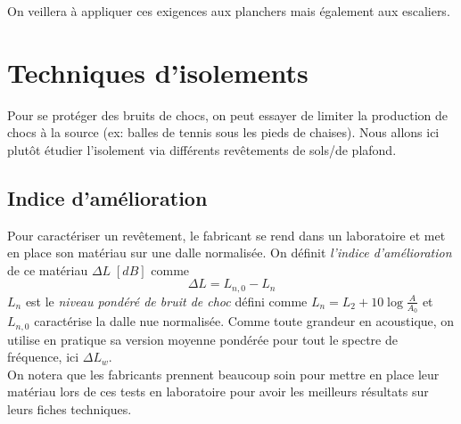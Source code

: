 \documentclass[11pt]{report}
\begin{document}
On veillera à appliquer ces exigences aux planchers mais également aux escaliers.

\section{Techniques d'isolements}
Pour se protéger des bruits de chocs, on peut essayer de limiter la production de chocs à la source (ex: balles de tennis sous les pieds de chaises). Nous allons ici plutôt étudier l'isolement via différents revêtements de sols/de plafond.

\subsection{Indice d'amélioration}
Pour caractériser un revêtement, le fabricant se rend dans un laboratoire et met en place son matériau sur une dalle normalisée. On définit \textit{l'indice d'amélioration} de ce matériau $\Delta L\;[dB]$ comme 
$$\Delta L = L_{n,0} - L_n$$
$L_n$ est le \textit{niveau pondéré de bruit de choc} défini comme $L_n = L_2 + 10 \log \frac{A}{A_0}$ et $L_{n,0}$ caractérise la dalle nue normalisée. Comme toute grandeur en acoustique, on utilise en pratique sa version moyenne pondérée pour tout le spectre de fréquence, ici $\Delta L_w$.\\

On notera que les fabricants prennent beaucoup soin pour mettre en place leur matériau lors de ces tests en laboratoire pour avoir les meilleurs résultats sur leurs fiches techniques.
\end{document}
